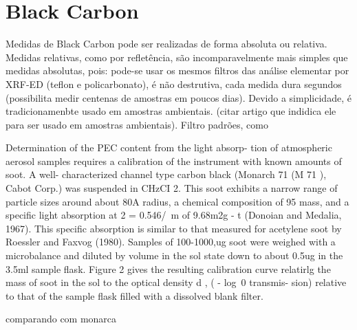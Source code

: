 \section{Black Carbon}


Medidas de Black Carbon pode ser realizadas de forma absoluta ou relativa. 
Medidas relativas, como por refletência, são incomparavelmente mais simples 
que medidas absolutas, pois: pode-se usar os mesmos filtros das análise
elementar por XRF-ED (teflon e policarbonato), é não destrutiva, cada medida
dura segundos (possibilita medir centenas de amostras em poucos dias). 
Devido a simplicidade, é tradicionamenbte usado em amostras ambientais. 
(citar artigo que indidica ele para ser usado em amostras ambientais). 
Filtro padrões, como 

Determination of the PEC content from the light absorp-
tion of atmospheric aerosol samples requires a calibration of
the instrument with known amounts of soot. A well-
characterized channel type carbon black (Monarch 71 (M 71 ),
Cabot Corp.) was suspended in CHzCI 2. This soot exhibits a
narrow range of particle sizes around about 80A radius, a
chemical composition of 95 %
mass, and a specific light absorption at 2 = 0.546/~m of
9.68m2g - t (Donoian and Medalia, 1967). This specific
absorption is similar to that measured for acetylene soot by
Roessler and Faxvog (1980). Samples of 100-1000,ug soot
were weighed with a microbalance and diluted by volume in
the sol state down to about 0.5ug in the 3.5ml sample flask.
Figure 2 gives the resulting calibration curve relatirlg the mass
of soot in the sol to the optical density d , ( - log~0 transmis-
sion) relative to that of the sample flask filled with a dissolved
blank filter.

comparando com monarca 





